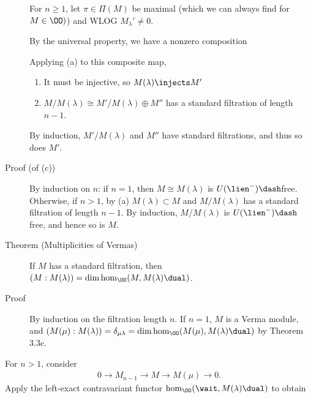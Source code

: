 \begin{description}
For \(n\geq 1\), let \(\pi \in \Pi(M)\) be maximal (which we can always
find for \(M\in \OO)\)) and WLOG \(M_\lambda' \neq 0\).

By the universal property, we have a nonzero composition

\begin{center}
\end{center}

Applying (a) to this composite map,

\begin{enumerate}
\def\labelenumi{\arabic{enumi}.}
\tightlist
\item
  It must be injective, so \(M(\lambda) \injects M'\)
\item
  \(M/M(\lambda) \cong M'/M(\lambda) \oplus M''\) has a standard
  filtration of length \(n-1\).
\end{enumerate}

By induction, \(M'/M(\lambda)\) and \(M''\) have standard filtrations,
and thus so does \(M'\).
\item[Proof (of (c))]
By induction on \(n\): if \(n=1\), then \(M \cong M(\lambda)\) is
\(U(\lien^-)\dash\)free. Otherwise, if \(n > 1\), by (a)
\(M(\lambda) \subset M\) and \(M/M(\lambda)\) has a standard filtration
of length \(n-1\). By induction, \(M/M(\lambda)\) is
\(U(\lien^-)\dash\)free, and hence so is \(M\).
\item[Theorem (Multiplicities of Vermas)]
If \(M\) has a standard filtration, then
\((M: M(\lambda)) = \dim \hom_\OO(M, M(\lambda)\dual)\).
\item[Proof]
By induction on the filtration length \(n\). If \(n=1\), \(M\) is a
Verma module, and
\((M(\mu) : M(\lambda)) = \delta_{\mu \lambda} = \dim \hom_\OO(M(\mu), M(\lambda)\dual)\)
by Theorem 3.3c.
\end{description}

For \(n>1\), consider
\begin{align*}0 \to M_{n-1} \to M \to M(\mu) \to 0.\end{align*} Apply
the left-exact contravariant functor
\(\hom_\OO(\wait, M(\lambda)\dual)\) to obtain

